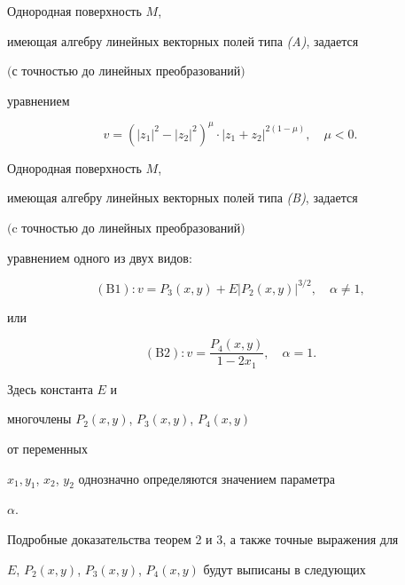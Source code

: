 \begin{thm}


Однородная поверхность $ M $, 


имеющая алгебру линейных векторных полей типа {\em (A)}, задается 


$($с точностью до линейных преобразований$)$


уравнением


$$


v = ( |z_1|^2 - |z_2|^2 )^{ \mu}\cdot | z_1 + z_2 |^{ 2 ( 1 - \mu ) }, 


\quad \mu < 0.


$$


\end{thm}








\begin{thm}


Однородная поверхность $ M $, 


имеющая алгебру линейных векторных полей типа {\em (B)}, задается 


$($c точностью до линейных преобразований$)$ 


уравнением одного из двух видов${:}$


$$


(\mathrm B1): v = P_3 ( x,y ) + E |P_2(x,y)|^{3/2}, \quad \alpha \ne 1, 


$$


или


$$


(\mathrm B2): v = \frac{ P_4(x,y)}{1- 2x_1}, \quad \alpha = 1.


$$





Здесь константа $ E $ и 


многочлены $ P_2(x,y)$, $P_3(x,y)$, $P_4(x,y) $ 


от переменных 


$ x_1, y_1$, $x_2$, $y_2 $ однозначно определяются значением параметра 


$ \alpha $. 


\end{thm}





Подробные доказательства теорем 2 и 3, а также точные выражения для 


$ E$, $P_2(x,y)$, $P_3(x,y)$, $P_4(x,y) $ будут выписаны в следующих


